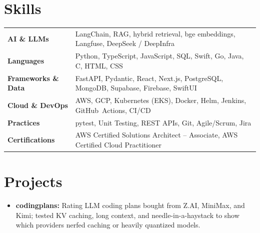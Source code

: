 \documentclass[11pt, letterpaper]{article}
\begin{document}
\section{Skills}
\begin{tabularx}{\textwidth}{@{}l @{\hspace{7pt}} >{\raggedright\arraybackslash}X@{}}
  \textbf{AI \& LLMs} & LangChain, RAG, hybrid retrieval, bge embeddings, Langfuse, DeepSeek / DeepInfra \\[1pt]
  \textbf{Languages} & Python, TypeScript, JavaScript, SQL, Swift, Go, Java, C, HTML, CSS \\[1pt]
  \textbf{Frameworks \& Data} & FastAPI, Pydantic, React, Next.js, PostgreSQL, MongoDB, Supabase, Firebase, SwiftUI \\[1pt]
  \textbf{Cloud \& DevOps} & AWS, GCP, Kubernetes (EKS), Docker, Helm, Jenkins, GitHub~Actions, CI/CD \\[1pt]
  \textbf{Practices} & pytest, Unit Testing, REST APIs, Git, Agile/Scrum, Jira \\[1pt]
  \textbf{Certifications} & AWS Certified Solutions Architect -- Associate, AWS Certified Cloud Practitioner \\
\end{tabularx}

\section{Projects}
\begin{itemize}
  \item \textbf{codingplans:} Rating LLM coding plans bought from Z.AI, MiniMax, and Kimi; tested KV caching, long context, and needle-in-a-haystack to show which providers nerfed caching or heavily quantized models.
\end{itemize}
\end{document}
